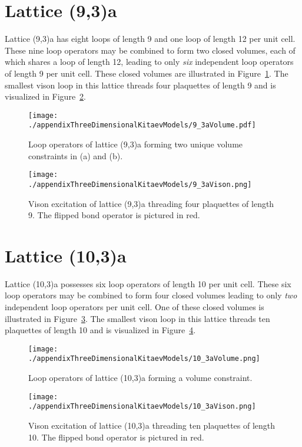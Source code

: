 \section{Lattice (9,3)a}
\label{appendix:ThreeDimensionalKitaevModels_9_3a}
%
%
Lattice (9,3)a has eight loops of length 9 and one loop of length 12 per unit cell.
These nine loop operators may be combined to form two closed volumes, each of which shares a loop of length 12, leading to only \textit{six} independent loop operators of length 9 per unit cell.
These closed volumes are illustrated in Figure~\ref{fig:appendix_9_3aVolume}.
The smallest vison loop in this lattice threads four plaquettes of length 9 and is visualized in Figure~\ref{fig:appendix_9_3aVison}.
%
\begin{figure}[ht!]
	\centering
	\texttt{[image: ./appendixThreeDimensionalKitaevModels/9\_3aVolume.pdf]}
	\caption{
		Loop operators of lattice (9,3)a forming two unique volume constraints in (a) and (b).
	}
	\label{fig:appendix_9_3aVolume}
\end{figure}
%
%
\begin{figure}[ht!]
	\centering
	\texttt{[image: ./appendixThreeDimensionalKitaevModels/9\_3aVison.png]}
	\caption{
		Vison excitation of lattice (9,3)a threading four plaquettes of length 9.
		The flipped bond operator is pictured in red.
	}
	\label{fig:appendix_9_3aVison}
\end{figure}
%


%
%
\section{Lattice (10,3)a}
\label{appendix:ThreeDimensionalKitaevModels_10_3a}
%
%
Lattice (10,3)a possesses six loop operators of length 10 per unit cell.
These six loop operators may be combined to form four closed volumes leading to only \textit{two} independent loop operators per unit cell.
One of these closed volumes is illustrated in Figure~\ref{fig:appendix_10_3aVolume}.
The smallest vison loop in this lattice threads ten plaquettes of length 10 and is visualized in Figure~\ref{fig:appendix_10_3aVison}.
%
\begin{figure}[ht!]
	\centering
	\texttt{[image: ./appendixThreeDimensionalKitaevModels/10\_3aVolume.png]}
	\caption{
		Loop operators of lattice (10,3)a forming a volume constraint.
	}
	\label{fig:appendix_10_3aVolume}
\end{figure}
%
%
\begin{figure}[ht!]
	\centering
	\texttt{[image: ./appendixThreeDimensionalKitaevModels/10\_3aVison.png]}
	\caption{
		Vison excitation of lattice (10,3)a threading ten plaquettes of length 10.
		The flipped bond operator is pictured in red.
	}
	\label{fig:appendix_10_3aVison}
\end{figure}
%


